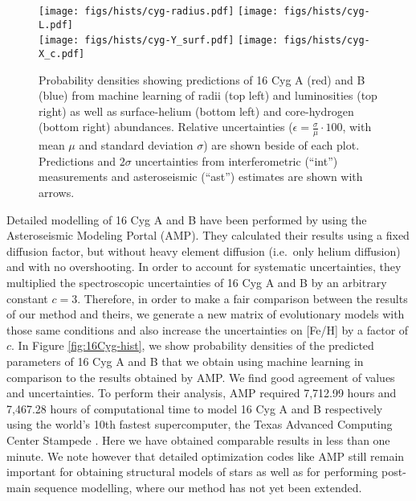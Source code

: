 \documentclass[manuscript]{aastex}
\begin{document}
\begin{figure*}
    \centering
    \texttt{[image: figs/hists/cyg-radius.pdf]}\hfill
    \texttt{[image: figs/hists/cyg-L.pdf]}\\
    \texttt{[image: figs/hists/cyg-Y\_surf.pdf]}\hfill
    \texttt{[image: figs/hists/cyg-X\_c.pdf]}\\
    \caption{Probability densities showing predictions of 16 Cyg A (red) and B (blue) from machine learning of radii (top left) and luminosities (top right) as well as surface-helium (bottom left) and core-hydrogen (bottom right) abundances. Relative uncertainties ($\epsilon = \frac{\sigma}{\mu}\cdot 100$, with mean $\mu$ and standard deviation $\sigma$) are shown beside of each plot. Predictions and $2\sigma$ uncertainties from interferometric (``int'') measurements and asteroseismic (``ast'') estimates are shown with arrows.}
    \label{fig:interferometry}
\end{figure*}

Detailed modelling of 16 Cyg A and B have been performed  by \citet{2015ApJ...811L..37M} using the Asteroseismic Modeling Portal (AMP). They calculated their results using a fixed diffusion factor, but without heavy element diffusion (i.e.~only helium diffusion) and with no overshooting. In order to account for systematic uncertainties, they multiplied the spectroscopic uncertainties of 16 Cyg A and B by an arbitrary constant $c=3$. Therefore, in order to make a fair comparison between the results of our method and theirs, we generate a new matrix of evolutionary models with those same conditions and also increase the uncertainties on [Fe/H] by a factor of $c$. In Figure \ref{fig:16Cyg-hist}, we show probability densities of the predicted parameters of 16 Cyg A and B that we obtain using machine learning in comparison to the results obtained by AMP. We find good agreement of values and uncertainties. To perform their analysis, AMP required 7,712.99 hours and 7,467.28 hours of computational time to model 16 Cyg A and B respectively using the world's 10th fastest supercomputer, the Texas Advanced Computing Center Stampede \citep{TOP500}. Here we have obtained comparable results in less than one minute. We note however that detailed optimization codes like AMP still remain important for obtaining structural models of stars as well as for performing post-main sequence modelling, where our method has not yet been extended. 
\end{document}
